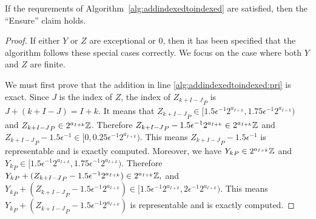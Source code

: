     \begin{lem}
      If the requrements of Algorithm~\ref{alg:addindexedtoindexed} are satisfied, then the ``Ensure'' claim holds.
      \label{lem:reduce}
    \end{lem}
    \begin{proof}
      If either $Y$ or $Z$ are exceptional or 0, then it has been specified that the algorithm follows these special cases correctly. We focus on the case where both $Y$ and $Z$ are finite.

      We must first prove that the addition in line \ref{alg:addindexedtoindexed:pri} is exact.
      Since $J$ is the index of $Z$, the index of ${Z_{k + I-J}}_P$ is
      $J + (k + I -J) = I + k$. It means that
      \(
        {Z_{k + I-J}}_P \in [1.5 \epsilon^{-1} 2^{a_{I+k}}, 1.75 \epsilon^{-1} 2^{a_{I+k}})
      \)
      and ${Z_{k + I-J}}_P \in 2^{a_{I+k}} \mathbb{Z}$.
      Therefore ${Z_{k + I-J}}_P - 1.5 \epsilon^{-1}  2^{a_{I+k}} \in 2^{a_{I+k}} \mathbb{Z}$
      and ${Z_{k + I-J}}_P - 1.5 \epsilon^{-1} \in [0, 0.25 \epsilon^{-1} 2^{a_{I+k}})$.
      This means ${Z_{k + I-J}}_P - 1.5 \epsilon^{-1}$ is representable and is
      exactly computed.
      Moreover, we have ${Y_{k}}_P \in 2^{a_{I+k}} \mathbb{Z}$ and
      \(
        {Y_{k}}_P \in [1.5 \epsilon^{-1} 2^{a_{I+k}}, 1.75 \epsilon^{-1} 2^{a_{I+k}})
      \).
      Therefore
      \(
        {Y_{k}}_P + ({Z_{k + I-J}}_P - 1.5 \epsilon^{-1}  2^{a_{I+k}})
          \in 2^{a_{I+k}} \mathbb{Z},
      \)
      and
      \(
        {Y_{k}}_P + ({Z_{k + I-J}}_P - 1.5 \epsilon^{-1}  2^{a_{I+k}})
          \in [1.5 \epsilon^{-1} 2^{a_{I+k}}, 2 \epsilon^{-1} 2^{a_{I+k}})
      \).
      This means ${Y_{k}}_P + ({Z_{k + I-J}}_P - 1.5 \epsilon^{-1}  2^{a_{I+k}})$
      is representable and is exactly computed.
    \end{proof}

